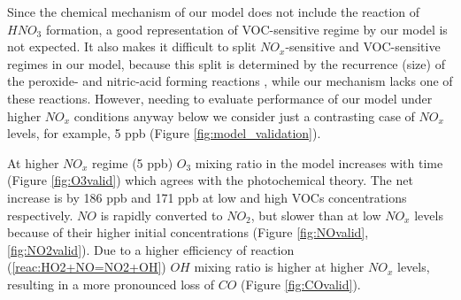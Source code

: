 \documentclass[11pt,a4paper]{article}
\begin{document}
Since the chemical mechanism of our model does not include the reaction of $HNO_3$ formation, a good representation of VOC-sensitive regime by our model is not expected. It also makes it difficult to split $NO_x$-sensitive and VOC-sensitive regimes in our model, because this split is determined by the recurrence (size) of the peroxide- and nitric-acid forming reactions \citep{Sillman1999}, while our mechanism lacks one of these reactions. However, needing to evaluate performance of our model under higher $NO_x$ conditions anyway below we consider just a contrasting case of $NO_x$ levels, for example, 5 ppb (Figure \ref{fig:model_validation}).

At higher $NO_x$ regime (5 ppb) $O_3$ mixing ratio in the model increases with time (Figure \ref{fig:O3valid}) which agrees with the photochemical theory. The net increase is by 186 ppb and 171 ppb at low and high VOCs concentrations respectively. $NO$ is rapidly converted to $NO_2$, but slower than at low $NO_x$ levels because of their higher initial concentrations (Figure \ref{fig:NOvalid}, \ref{fig:NO2valid}). Due to a higher efficiency of reaction (\ref{reac:HO2+NO=NO2+OH}) $OH$ mixing ratio is higher at higher $NO_x$ levels, resulting in a more pronounced loss of $CO$ (Figure \ref{fig:COvalid}).
\end{document}

